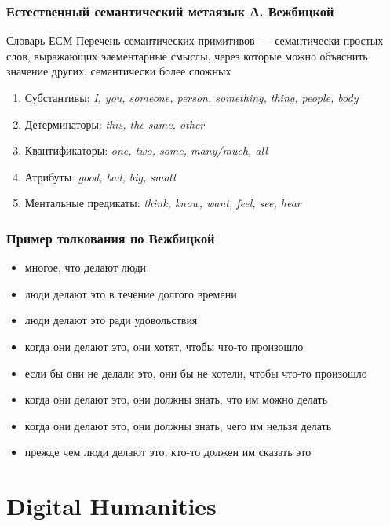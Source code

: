 \begin{frame}
  \frametitle{Естественный семантический метаязык А. Вежбицкой}

  \begin{exampleblock}{Словарь ЕСМ}
    Перечень семантических примитивов~--- семантически простых слов, выражающих элементарные смыслы,
    через которые можно объяснить значение других, семантически более сложных
  \end{exampleblock}

  \begin{enumerate}
    \item Субстантивы: \textit{I, you, someone, person, something, thing, people, body}
    \item Детерминаторы: \textit{this, the same, other}
    \item Квантификаторы: \textit{one, two, some, many/much, all}
    \item Атрибуты: \textit{good, bad, big, small}
    \item Ментальные предикаты: \textit{think, know, want, feel, see, hear}
  \end{enumerate}
\end{frame}

\begin{frame}
  \frametitle{Пример толкования по Вежбицкой}

  \begin{exampleblock}{}
    \begin{itemize}
      \item многое, что делают люди
      \item люди делают это в течение долгого времени
      \item люди делают это ради удовольствия
      \item когда они делают это, они хотят, чтобы что-то произошло
      \item если бы они не делали это, они бы не хотели, чтобы что-то произошло
      \item когда они делают это, они должны знать, что им можно делать
      \item когда они делают это, они должны знать, чего им нельзя делать
      \item прежде чем люди делают это, кто-то должен им сказать это
    \end{itemize}
  \end{exampleblock}
\end{frame}

\section{Digital Humanities}
\frame{\tableofcontents[currentsection]}

